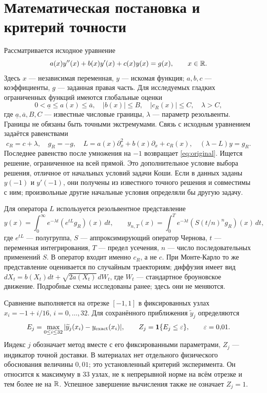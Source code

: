 \section{Математическая постановка и критерий точности}
Рассматривается исходное уравнение
\begin{equation}\label{eq:original}
a(x)y''(x)+b(x)y'(x)+c(x)y(x)=g(x),\qquad x\in\mathbb R.
\end{equation}
Здесь $x$ --- независимая переменная, $y$ --- искомая функция; $a,b,c$ --- коэффициенты, $g$ --- заданная правая часть. Для исследуемых гладких ограниченных функций имеются глобальные оценки
\begin{equation}\label{eq:conditions}
0<\underline a\le a(x)\le\overline a,\quad |b(x)|\le B,
\quad |c_R(x)|\le C,\quad \lambda>C,
\end{equation}
где $\underline a,\overline a,B,C$ --- известные числовые границы, $\lambda$ --- параметр резольвенты. Границы не обязаны быть точными экстремумами. Связь с исходным уравнением задаётся равенствами
\begin{equation}\label{eq:operator}
c_R=c+\lambda,\quad g_R=-g,\quad
L=a(x)\partial_x^2+b(x)\partial_x+c_R(x),\quad (\lambda-L)y=g_R.
\end{equation}
Последнее равенство после умножения на $-1$ возвращает \eqref{eq:original}. Ищется решение, ограниченное на всей прямой. Это дополнительное условие выбора решения, отличное от начальных условий задачи Коши. Если в данных заданы $y(-1)$ и $y'(-1)$, они получены из известного точного решения и совместимы с ним; произвольные другие начальные условия определяли бы другую задачу.

\clearpage
Для оператора $L$ используется резольвентное представление
\begin{equation}\label{eq:resolvent}
y(x)=\int_0^\infty e^{-\lambda t}(e^{tL}g_R)(x)\,dt,
\qquad y_{n,T}(x)=\int_0^T e^{-\lambda t}(S(t/n)^ng_R)(x)\,dt,
\end{equation}
где $e^{tL}$ --- полугруппа, $S$ --- аппроксимирующий оператор Чернова, $t$ --- переменная интегрирования, $T$ --- предел усечения, $n$ --- число последовательных применений $S$. В оператор входит именно $c_R$, а не $c$. При Монте-Карло то же представление оценивается по случайным траекториям; диффузия имеет вид $dX_t=b(X_t)dt+\sqrt{2a(X_t)}\,dW_t$, где $W_t$ --- стандартное броуновское движение. Подробные схемы исследованы ранее; здесь они не меняются.

Сравнение выполняется на отрезке $[-1,1]$ в фиксированных узлах $x_i=-1+i/16$, $i=0,\ldots,32$. Для сохранённого приближения $\widetilde y_j$ определяются
\begin{equation}\label{eq:error}
E_j=\max_{0\le i\le32}|\widetilde y_j(x_i)-y_{\mathrm{exact}}(x_i)|,
\qquad Z_j=\mathbf 1\{E_j\le\varepsilon\},\qquad \varepsilon=0{,}01.
\end{equation}
Индекс $j$ обозначает метод вместе с его фиксированными параметрами, $Z_j$ --- индикатор точной доставки. В материалах нет отдельного физического обоснования величины $0{,}01$; это установленный критерий эксперимента. Он относится к максимуму в 33 узлах, не к непрерывной норме на всём отрезке и тем более не на $\mathbb R$. Успешное завершение вычисления также не означает $Z_j=1$.

